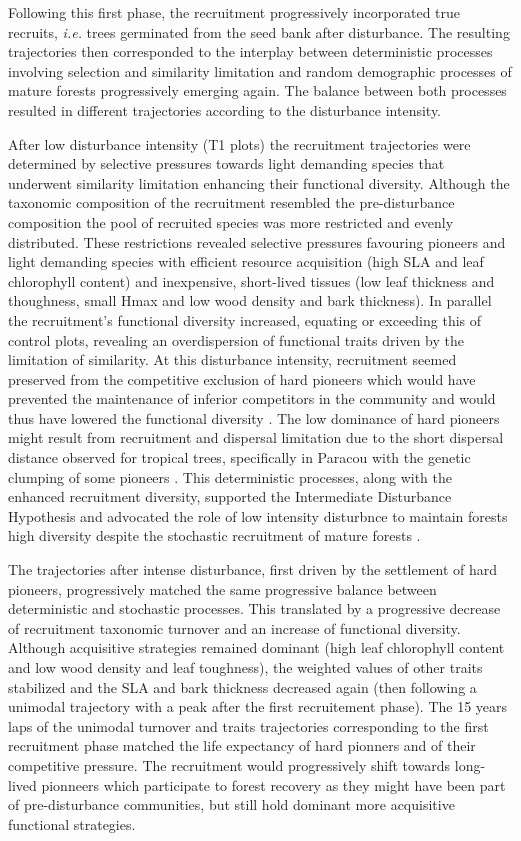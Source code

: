 \documentclass[fleqn,10pt]{ArtEcoFoG} %
\begin{document}
Following this first phase, the recruitment progressively incorporated
true recruits, \emph{i.e.} trees germinated from the seed bank after
disturbance. The resulting trajectories then corresponded to the
interplay between deterministic processes involving selection and
similarity limitation and random demographic processes of mature forests
progressively emerging again. The balance between both processes
resulted in different trajectories according to the disturbance
intensity.

After low disturbance intensity (T1 plots) the recruitment trajectories
were determined by selective pressures towards light demanding species
that underwent similarity limitation enhancing their functional
diversity. Although the taxonomic composition of the recruitment
resembled the pre-disturbance composition the pool of recruited species
was more restricted and evenly distributed. These restrictions revealed
selective pressures favouring pioneers and light demanding species with
efficient resource acquisition (high SLA and leaf chlorophyll content)
and inexpensive, short-lived tissues (low leaf thickness and thoughness,
small Hmax and low wood density and bark thickness). In parallel the
recruitment's functional diversity increased, equating or exceeding this
of control plots, revealing an overdispersion of functional traits
driven by the limitation of similarity. At this disturbance intensity,
recruitment seemed preserved from the competitive exclusion of hard
pioneers which would have prevented the maintenance of inferior
competitors in the community and would thus have lowered the functional
diversity \citep{Hubbell1999, Sheil2003, Bongers2009}. The low dominance
of hard pioneers might result from recruitment and dispersal limitation
due to the short dispersal distance observed for tropical trees,
specifically in Paracou with the genetic clumping of some pioneers
\citep{Leclerc2015, Scotti2015a}. This deterministic processes, along
with the enhanced recruitment diversity, supported the Intermediate
Disturbance Hypothesis and advocated the role of low intensity
disturbnce to maintain forests high diversity despite the stochastic
recruitment of mature forests \citep{Molino2001, Sheil2003}.

The trajectories after intense disturbance, first driven by the
settlement of hard pioneers, progressively matched the same progressive
balance between deterministic and stochastic processes. This translated
by a progressive decrease of recruitment taxonomic turnover and an
increase of functional diversity. Although acquisitive strategies
remained dominant (high leaf chlorophyll content and low wood density
and leaf toughness), the weighted values of other traits stabilized and
the SLA and bark thickness decreased again (then following a unimodal
trajectory with a peak after the first recruitement phase). The 15 years
laps of the unimodal turnover and traits trajectories corresponding to
the first recruitment phase matched the life expectancy of hard pionners
and of their competitive pressure. The recruitment would progressively
shift towards long-lived pionneers which participate to forest recovery
as they might have been part of pre-disturbance communities, but still
hold dominant more acquisitive functional strategies.
\end{document}
